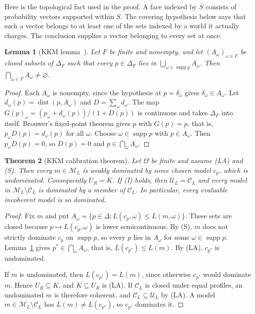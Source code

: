 \documentclass[11pt]{article}
\newtheorem{theorem}{Theorem}[section]
\newtheorem{lemma}[theorem]{Lemma}
\theoremstyle{definition}
\theoremstyle{remark}
\newcommand{\M}{\mathcal M}
\newcommand{\C}{\mathcal C}
\newcommand{\U}{\mathcal U}
\newcommand{\supp}{\operatorname{supp}}
\begin{document}
Here is the topological fact used in the proof. A face indexed by $S$ consists of probability vectors supported within $S$. The covering hypothesis below says that such a vector belongs to at least one of the sets indexed by a world it actually charges. The conclusion supplies a vector belonging to every set at once.
\begin{lemma}[KKM lemma~\cite{KKM}]\label{lem:kkm}
Let $F$ be finite and nonempty, and let $(A_\omega)_{\omega\in F}$ be closed subsets of $\Delta_F$ such that every $p\in\Delta_F$ lies in $\bigcup_{\omega\in\supp p}A_\omega$. Then $\bigcap_{\omega\in F}A_\omega\ne\varnothing$.
\end{lemma}
\begin{proof}
Each $A_\omega$ is nonempty, since the hypothesis at $p=\delta_\omega$ gives $\delta_\omega\in A_\omega$. Let $d_\omega(p)=\operatorname{dist}(p,A_\omega)$ and $D=\sum_\omega d_\omega$. The map $G(p)_\omega=(p_\omega+d_\omega(p))/(1+D(p))$ is continuous and takes $\Delta_F$ into itself. Brouwer's fixed-point theorem gives $p$ with $G(p)=p$, that is, $p_\omega D(p)=d_\omega(p)$ for all $\omega$. Choose $\omega\in\supp p$ with $p\in A_\omega$. Then $p_\omega D(p)=0$, so $D(p)=0$ and $p\in\bigcap_\omega A_\omega$.
\end{proof}
\begin{theorem}[KKM calibration theorem]\label{thm:kkm}
Let $\Omega$ be finite and assume (LA) and (S). Then every $m\in\M_L$ is weakly dominated by some chosen model $c_p$, which is undominated. Consequently $U_R=K$. If (I) holds, then $\U_L=\C_L$ and every model in $\M_L\setminus\C_L$ is dominated by a member of $\C_L$. In particular, every evaluable incoherent model is so dominated.
\end{theorem}
\begin{proof}
Fix $m$ and put $A_\omega=\{p\in\Delta:L(c_p,\omega)\le L(m,\omega)\}$. These sets are closed because $p\mapsto L(c_p,\omega)$ is lower semicontinuous. By (S), $m$ does not strictly dominate $c_p$ on $\supp p$, so every $p$ lies in $A_\omega$ for some $\omega\in\supp p$. Lemma~\ref{lem:kkm} gives $p^*\in\bigcap_\omega A_\omega$, that is, $L(c_{p^*})\le L(m)$. By (LA), $c_{p^*}$ is undominated.

If $m$ is undominated, then $L(c_{p^*})=L(m)$, since otherwise $c_{p^*}$ would dominate $m$. Hence $U_R\subseteq K$, and $K\subseteq U_R$ is (LA). If $\C_L$ is closed under equal profiles, an undominated $m$ is therefore coherent, and $\C_L\subseteq\U_L$ by (LA). A model $m\in\M_L\setminus\C_L$ has $L(m)\ne L(c_{p^*})$, so $c_{p^*}$ dominates it.
\end{proof}
\end{document}
